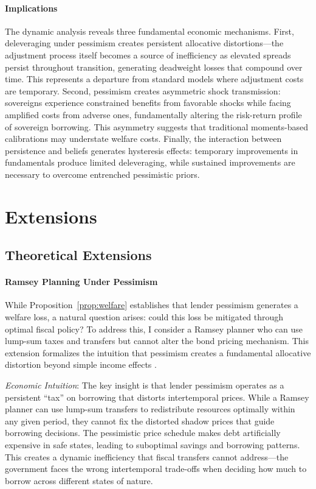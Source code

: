 \documentclass[12pt]{article}
\theoremstyle{plain}
\begin{document}
\paragraph{Implications}

The dynamic analysis reveals three fundamental economic mechanisms. First,
deleveraging under pessimism creates persistent allocative distortions—the
adjustment process itself becomes a source of inefficiency as elevated spreads
persist throughout transition, generating deadweight losses that compound over
time. This represents a departure from standard models where adjustment costs
are temporary. Second, pessimism creates asymmetric shock transmission:
sovereigns experience constrained benefits from favorable shocks while facing
amplified costs from adverse ones, fundamentally altering the risk-return
profile of sovereign borrowing. This asymmetry suggests that traditional
moments-based calibrations may understate welfare costs. Finally, the
interaction between persistence and beliefs generates hysteresis effects:
temporary improvements in fundamentals produce limited deleveraging, while
sustained improvements are necessary to overcome entrenched pessimistic priors.

\section{Extensions}

\subsection{Theoretical Extensions}

\paragraph{Ramsey Planning Under Pessimism}\label{sec:ramsey}

While Proposition~\ref{prop:welfare} establishes that lender pessimism
generates a welfare loss, a natural question arises: could this loss be
mitigated through optimal fiscal policy? To address this, I consider a Ramsey
planner \citep{LucasStokey1983} who can use lump-sum taxes and transfers but
cannot alter the bond pricing mechanism. This extension formalizes the
intuition that pessimism creates a fundamental allocative distortion beyond
simple income effects \citep{ChariKehoe1999}.

\textit{Economic Intuition}: The key insight is that lender pessimism operates as a persistent ``tax'' on borrowing that distorts intertemporal prices. While a Ramsey planner can use lump-sum transfers to redistribute resources optimally within any given period, they cannot fix the distorted shadow prices that guide borrowing decisions. The pessimistic price schedule makes debt artificially expensive in safe states, leading to suboptimal savings and borrowing patterns. This creates a dynamic inefficiency that fiscal transfers cannot address---the government faces the wrong intertemporal trade-offs when deciding how much to borrow across different states of nature.
\end{document}

